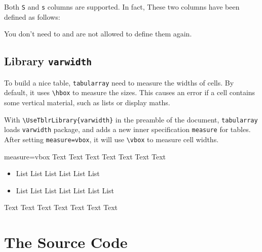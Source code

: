 \documentclass[oneside]{book}
\begin{document}
Both \verb!S! and \verb!s! columns are supported. In fact, These two columns have been defined as follows:
You don't need to and are not allowed to define them again.

\section{Library \texttt{varwidth}}

To build a nice table, \verb!tabularray! need to measure the widths of cells.
By default, it uses \verb!\hbox! to measure the sizes.
This causes an error if a cell contains some vertical material, such as lists or display maths.

With \verb!\UseTblrLibrary{varwidth}! in the preamble of the document,
\verb!tabularray! loads \verb!varwidth! package,
and adds a new inner specification \verb!measure! for tables.
After setting \verb!measure=vbox!, it will use \verb!\vbox! to measure cell widths.

\begin{demohigh}
\begin{tblr}{measure=vbox}
\hline
  Text Text Text Text Text Text Text
  \begin{itemize}
    \item List List List List List List
    \item List List List List List List List
  \end{itemize}
  Text Text Text Text Text Text Text \\
\hline
\end{tblr}
\end{demohigh}

\chapter{The Source Code}

\end{document}

